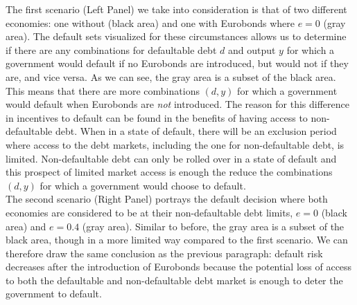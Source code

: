 The first scenario (Left Panel) we take into consideration is that of two different economies: one without (black area) and one with Eurobonds where $e = 0$ (gray area). The default sets visualized for these circumstances allows us to determine if there are any combinations for defaultable debt $d$ and output $y$ for which a government would default if no Eurobonds are introduced, but would not if they are, and vice versa. As we can see, the gray area is a subset of the black area. This means that there are more combinations $(d,y)$ for which a government would default when Eurobonds are \textit{not} introduced. The reason for this difference in incentives to default can be found in the benefits of having access to non-defaultable debt. When in a state of default, there will be an exclusion period where access to the debt markets, including the one for non-defaultable debt, is limited. Non-defaultable debt can only be rolled over in a state of default and this prospect of limited market access is enough the reduce the combinations $(d,y)$ for which a government would choose to default.\\ 

The second scenario (Right Panel) portrays the default decision where both economies are considered to be at their non-defaultable debt limits, $e = 0$ (black area) and $e = 0.4$ (gray area). Similar to before, the gray area is a subset of the black area, though in a more limited way compared to the first scenario. We can therefore draw the same conclusion as the previous paragraph: default risk decreases after the introduction of Eurobonds because the potential loss of access to both the defaultable and non-defaultable debt market is enough to deter the government to default.\\

